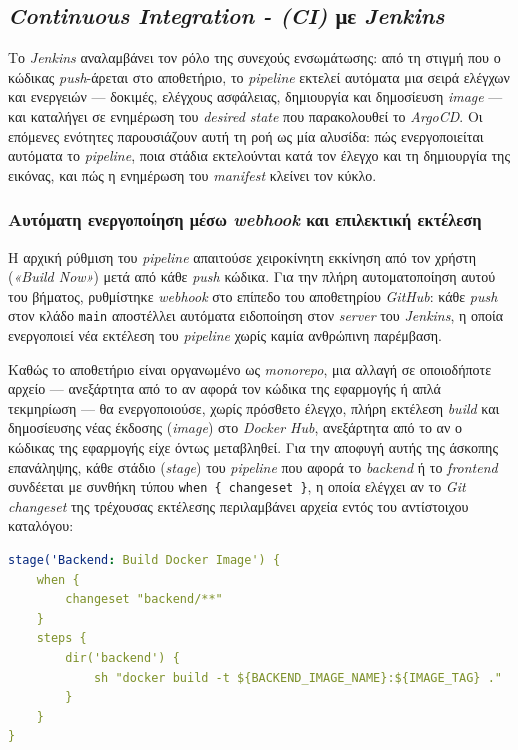 \subsection{\textit{Continuous Integration - (CI)} με \textit{Jenkins}}

Το \textit{Jenkins} αναλαμβάνει τον ρόλο της συνεχούς ενσωμάτωσης: από τη στιγμή που ο κώδικας \textit{push}-άρεται στο αποθετήριο, το \textit{pipeline} εκτελεί αυτόματα μια σειρά ελέγχων και ενεργειών --- δοκιμές, ελέγχους ασφάλειας, δημιουργία και δημοσίευση \textit{image} --- και καταλήγει σε ενημέρωση του \textit{desired state} που παρακολουθεί το \textit{ArgoCD}. Οι επόμενες ενότητες παρουσιάζουν αυτή τη ροή ως μία αλυσίδα: πώς ενεργοποιείται αυτόματα το \textit{pipeline}, ποια στάδια εκτελούνται κατά τον έλεγχο και τη δημιουργία της εικόνας, και πώς η ενημέρωση του \textit{manifest} κλείνει τον κύκλο.

\subsubsection{Αυτόματη ενεργοποίηση μέσω \textit{webhook} και επιλεκτική εκτέλεση}

Η αρχική ρύθμιση του \textit{pipeline} απαιτούσε χειροκίνητη εκκίνηση από τον χρήστη (\textit{«Build Now»}) μετά από κάθε \textit{push} κώδικα. Για την πλήρη αυτοματοποίηση αυτού του βήματος, ρυθμίστηκε \textit{webhook} στο επίπεδο του αποθετηρίου \textit{GitHub}: κάθε \textit{push} στον κλάδο \texttt{main} αποστέλλει αυτόματα ειδοποίηση στον \textit{server} του \textit{Jenkins}, η οποία ενεργοποιεί νέα εκτέλεση του \textit{pipeline} χωρίς καμία ανθρώπινη παρέμβαση.

Καθώς το αποθετήριο είναι οργανωμένο ως \textit{monorepo}, μια αλλαγή σε οποιοδήποτε αρχείο --- ανεξάρτητα από το αν αφορά τον κώδικα της εφαρμογής ή απλά τεκμηρίωση --- θα ενεργοποιούσε, χωρίς πρόσθετο έλεγχο, πλήρη εκτέλεση \textit{build} και δημοσίευσης νέας έκδοσης (\textit{image}) στο \textit{Docker Hub}, ανεξάρτητα από το αν ο κώδικας της εφαρμογής είχε όντως μεταβληθεί. Για την αποφυγή αυτής της άσκοπης επανάληψης, κάθε στάδιο (\textit{stage}) του \textit{pipeline} που αφορά το \textit{backend} ή το \textit{frontend} συνδέεται με συνθήκη τύπου \texttt{when \{ changeset \}}, η οποία ελέγχει αν το \textit{Git changeset} της τρέχουσας εκτέλεσης περιλαμβάνει αρχεία εντός του αντίστοιχου καταλόγου:


\begin{lstlisting}[language=yaml, caption={Jenkins Pipeline stage για το build του Backend}]
stage('Backend: Build Docker Image') {
    when {
        changeset "backend/**"
    }
    steps {
        dir('backend') {
            sh "docker build -t ${BACKEND_IMAGE_NAME}:${IMAGE_TAG} ."
        }
    }
}
\end{lstlisting}


